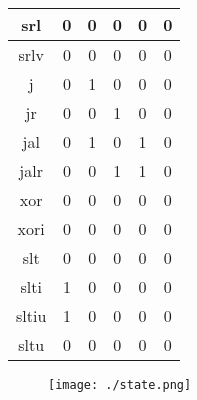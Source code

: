 \documentclass[UTF8]{ctexart}
\begin{document}
\begin{table}[H]
\begin{threeparttable}
\begin{tabular}{|c|c|c|c|c|c|}
			\hline
			srl                                      & 0               & 0             & 0                & 0             & 0                 \\
			\hline
			srlv                                     & 0               & 0             & 0                & 0             & 0                 \\
			\hline
			j                                        & 0               & 1             & 0                & 0             & 0                 \\
			\hline
			jr                                       & 0               & 0             & 1                & 0             & 0                 \\
			\hline
			jal                                      & 0               & 1             & 0                & 1             & 0                 \\
			\hline
			jalr                                     & 0               & 0             & 1                & 1             & 0                 \\
			\hline
			xor                                      & 0               & 0             & 0                & 0             & 0                 \\
			\hline
			xori                                     & 0               & 0             & 0                & 0             & 0                 \\
			\hline
			slt                                      & 0               & 0             & 0                & 0             & 0                 \\
			\hline
			slti                                     & 1               & 0             & 0                & 0             & 0                 \\
			\hline
			sltiu                                    & 1               & 0             & 0                & 0             & 0                 \\
			\hline
			sltu                                     & 0               & 0             & 0                & 0             & 0                 \\
			\hline
		\end{tabular}
	\end{threeparttable}
\end{table}
\begin{figure}
	\centering
	\texttt{[image: ./state.png]}
\end{figure}
\newpage
\end{document}
